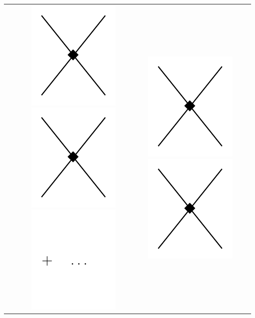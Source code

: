 \begin{table}
\begin{tabular}{ c | c | c | c }
{\includegraphics[scale=0.55,page=6]{Introduction/Figures/N3LO}
\includegraphics[scale=0.55,page=7]{Introduction/Figures/N3LO}
\includegraphics[scale=0.55,page=1]{Introduction/Figures/ellipsis} 
} &
\parbox[c][][c]{5.8cm}{\centering
\includegraphics[scale=0.55,page=8]{Introduction/Figures/N3LO}\hspace{.2cm}
\includegraphics[scale=0.55,page=9]{Introduction/Figures/N3LO}\hspace{.2cm}
}
\end{tabular}
\end{table}
